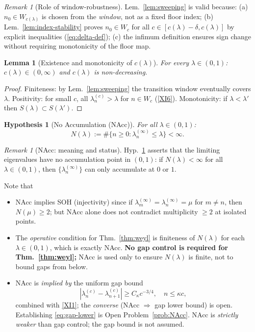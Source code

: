 \documentclass[12pt,a4paper]{amsart}
\newtheorem{lemma}[theorem]{Lemma}
\newtheorem{hypothesis}[theorem]{Hypothesis}
\theoremstyle{definition}
\theoremstyle{remark}
\newtheorem{remark}[theorem]{Remark}
\begin{document}
\begin{remark}[Role of window-robustness]
Lem.~\ref{lem:sweeping} is valid because:
(a) $n_0\in W_{c(\lambda)}$ is chosen from
the \emph{window}, not as a fixed floor index;
(b) Lem.~\ref{lem:index-stability} proves
$n_0\in W_c$ for all
$c\in[c(\lambda)-\delta,c(\lambda)]$
by explicit inequalities (\eqref{eq:delta-def});
(c) the infimum definition ensures sign change
without requiring monotonicity of the floor map.
\end{remark}

\begin{lemma}[Existence and monotonicity of $c(\lambda)$]
\label{lem:clambda-exists}
For every $\lambda\in(0,1)$:
$c(\lambda)\in(0,\infty)$
and $c(\lambda)$ is non-decreasing.
\end{lemma}
\begin{proof}
Finiteness: by Lem.~\ref{lem:sweeping}
the transition window eventually covers $\lambda$.
Positivity: for small $c$, all $\lambda_n^{(c)}>\lambda$
for $n\in W_c$ (\eqref{XI6}).
Monotonicity: if $\lambda<\lambda'$ then
$S(\lambda)\subset S(\lambda')$.
\end{proof}

\begin{hypothesis}[No Accumulation (NAcc)]
\label{hyp:NAcc}
For all $\lambda\in(0,1)$:
\[
  N(\lambda)
  := \#\bigl\{n\ge 0:
     \lambda_n^{(\infty)}\le\lambda\bigr\}
  < \infty.
\]
\end{hypothesis}

\begin{remark}[NAcc: meaning and status]
\label{rem:NAcc}
Hyp.~\ref{hyp:NAcc} asserts that the limiting
eigenvalues have no accumulation point in $(0,1)$:
if $N(\lambda)<\infty$ for all $\lambda\in(0,1)$,
then $\{\lambda_n^{(\infty)}\}$ can only
accumulate at $0$ or $1$.

Note that
\begin{itemize}
\item NAcc implies SOH (injectivity)
      since if $\lambda_m^{(\infty)}
      =\lambda_n^{(\infty)}=\mu$ for $m\ne n$,
      then $N(\mu)\ge 2$;
      but NAcc alone does not contradict
      multiplicity $\ge 2$ at isolated points.
\item The \emph{operative} condition for
      Thm.~\ref{thm:weyl} is finiteness of
      $N(\lambda)$ for each $\lambda\in(0,1)$,
      which is exactly NAcc.
      \textbf{No gap control is required for
      Thm.~\ref{thm:weyl};} NAcc is used only
      to ensure $N(\lambda)$ is finite,
      not to bound gaps from below.
\item NAcc is \emph{implied by} the uniform
      gap bound
      \begin{equation}\label{eq:gap-lower}
        |\lambda_n^{(c)}-\lambda_{n+1}^{(c)}|
        \ge C_\kappa c^{-3/4},
        \quad n\le\kappa c,
      \end{equation}
      combined with \eqref{XI1};
      the \emph{converse} (NAcc $\Rightarrow$
      gap lower bound) is open.
      Establishing \eqref{eq:gap-lower} is
      Open Problem~\ref{prob:NAcc}.
      NAcc is \emph{strictly weaker} than
      gap control; the gap bound is not assumed.
\end{itemize}
\end{remark}
\end{document}
